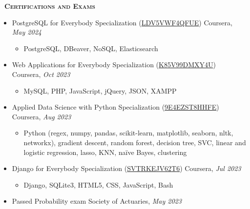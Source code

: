 \documentclass[a4paper,11pt]{article}
\newcommand{\header} [1] {
    \vspace{0.5mm}
    {\textsc{\textbf{\large{\xrfill[0.5ex]{0.5pt}~#1~\xrfill[0.5ex]{0.5pt}}}}} %
}
\begin{document}
\header{Certifications and Exams} \\
\vspace{0.5mm}
\begin{itemize}
    \item PostgreSQL for Everybody Specialization (\href{https://www.coursera.org/account/accomplishments/specialization/LDV5VWF4QFUE}{LDV5VWF4QFUE}) \hfill Coursera, \textit{May 2024}
    \begin{itemize}
        \item PostgreSQL, DBeaver, NoSQL, Elasticsearch
    \end{itemize}
    \item Web Applications for Everybody Specialization (\href{https://www.coursera.org/account/accomplishments/specialization/K85V99DMXY4U}{K85V99DMXY4U}) \hfill Coursera, \textit{Oct 2023}
    \begin{itemize}
        \item MySQL, PHP, JavaScript, jQuery, JSON, XAMPP
    \end{itemize}
    \item Applied Data Science with Python Specialization (\href{https://www.coursera.org/account/accomplishments/specialization/9E4EZST8HHFE}{9E4EZST8HHFE}) \hfill Coursera, \textit{Aug 2023}
    \begin{itemize}
        \item Python (regex, numpy, pandas, scikit-learn, matplotlib, seaborn, nltk, networkx), gradient descent, random forest, decision tree, SVC, linear and logistic regression, lasso, KNN, na\"{i}ve Bayes, clustering
    \end{itemize}
    \item Django for Everybody Specialization (\href{https://www.coursera.org/account/accomplishments/specialization/SVTRKEJV62T6}{SVTRKEJV62T6}) \hfill Coursera, \textit{Jul 2023}
    \begin{itemize}
        \item Django, SQLite3, HTML5, CSS, JavaScript, Bash
    \end{itemize}
    \item Passed Probability exam \hfill Society of Actuaries, \textit{May 2023}
\end{itemize}
\vspace{0.5mm}


\end{document}

